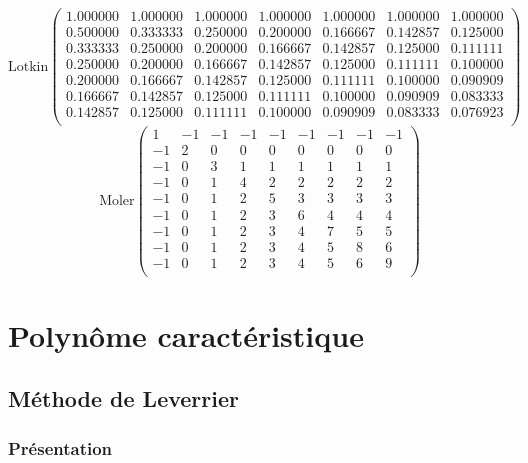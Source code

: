 \documentclass{report}
\begin{document}
      \begin{equation}
	\text{Lotkin}
	\begin{pmatrix}
	  1.000000 & 1.000000 & 1.000000 & 1.000000 & 1.000000 & 1.000000 & 1.000000 \\ 
	  0.500000 & 0.333333 & 0.250000 & 0.200000 & 0.166667 & 0.142857 & 0.125000 \\ 
	  0.333333 & 0.250000 & 0.200000 & 0.166667 & 0.142857 & 0.125000 & 0.111111 \\ 
	  0.250000 & 0.200000 & 0.166667 & 0.142857 & 0.125000 & 0.111111 & 0.100000 \\ 
	  0.200000 & 0.166667 & 0.142857 & 0.125000 & 0.111111 & 0.100000 & 0.090909 \\ 
	  0.166667 & 0.142857 & 0.125000 & 0.111111 & 0.100000 & 0.090909 & 0.083333 \\ 
	  0.142857 & 0.125000 & 0.111111 & 0.100000 & 0.090909 & 0.083333 & 0.076923 \\ 
	\end{pmatrix}
	\label{syst8}
      \end{equation}
      \begin{equation}
	\text{Moler}
	\begin{pmatrix}
	  1 & -1 & -1 & -1 & -1 & -1 & -1 & -1 & -1 \\ 
	  -1 & 2 & 0 & 0 & 0 & 0 & 0 & 0 & 0 \\ 
	  -1 & 0 & 3 & 1 & 1 & 1 & 1 & 1 & 1 \\ 
	  -1 & 0 & 1 & 4 & 2 & 2 & 2 & 2 & 2 \\ 
	  -1 & 0 & 1 & 2 & 5 & 3 & 3 & 3 & 3 \\ 
	  -1 & 0 & 1 & 2 & 3 & 6 & 4 & 4 & 4 \\ 
	  -1 & 0 & 1 & 2 & 3 & 4 & 7 & 5 & 5 \\ 
	  -1 & 0 & 1 & 2 & 3 & 4 & 5 & 8 & 6 \\ 
	  -1 & 0 & 1 & 2 & 3 & 4 & 5 & 6 & 9 \\ 
	\end{pmatrix}
	\label{syst9}
      \end{equation}

  \chapter{Polynôme caractéristique}
    \section{Méthode de Leverrier}
      \subsection{Présentation}
      
\end{document}
